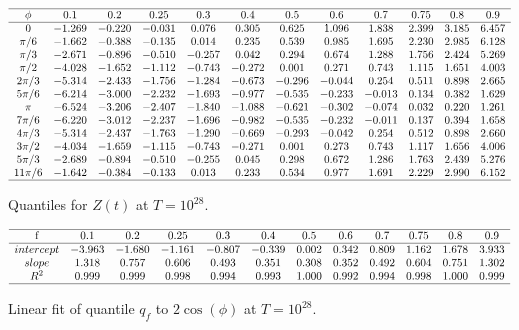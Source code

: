 \documentclass[twoside]{article}
\begin{document}
\begin{table}
\centering \(\begin{array}{cccccccccccc}
\hline
\phi&0.1&0.2&0.25&0.3&0.4&0.5&0.6&0.7&0.75&0.8&0.9 \\
\hline
0&-1.269&-0.220&-0.031&0.076&0.305&0.625&1.096&1.838&2.399&3.185&6.457\\
\pi/6 &-1.662&-0.388&-0.135&0.014&0.235&0.539&0.985&1.695&2.230&2.985&6.128\\
\pi/3 &-2.671&-0.896&-0.510&-0.257&0.042&0.294&0.674&1.288&1.756&2.424&5.269\\
\pi/2 &-4.028&-1.652&-1.112&-0.743&-0.272&0.001&0.271&0.743&1.115&1.651&4.003\\
2\pi/3 &-5.314&-2.433&-1.756&-1.284&-0.673&-0.296&-0.044&0.254&0.511&0.898&2.665\\
5\pi/6 &-6.214&-3.000&-2.232&-1.693&-0.977&-0.535&-0.233&-0.013&0.134&0.382&1.629\\
\pi &-6.524&-3.206&-2.407&-1.840&-1.088&-0.621&-0.302&-0.074&0.032&0.220&1.261\\
7\pi/6 &-6.220&-3.012&-2.237&-1.696&-0.982&-0.535&-0.232&-0.011&0.137&0.394&1.658\\
4\pi/3 &-5.314&-2.437&-1.763&-1.290&-0.669&-0.293&-0.042&0.254&0.512&0.898&2.660\\
3\pi/2 &-4.034&-1.659&-1.115&-0.743&-0.271&0.001&0.273&0.743&1.117&1.656&4.006\\
5\pi/3 &-2.689&-0.894&-0.510&-0.255&0.045&0.298&0.672&1.286&1.763&2.439&5.276\\
11\pi/6 &-1.642&-0.384&-0.133&0.013&0.233&0.534&0.977&1.691&2.229&2.990&6.152\\
\hline
\end{array}\)
\caption{Quantiles  for  $Z(t)$ at $T=10^{28}$.}
\label{tab:quantiles28}
\end{table}

\begin{table}
\centering \(\begin{array}{cccccccccccc}
\hline
$f$&0.1&0.2&0.25&0.3&0.4&0.5&0.6&0.7&0.75&0.8&0.9\\
\hline
intercept&-3.963&-1.680&-1.161&-0.807&-0.339&0.002&0.342&0.809&1.162&1.678&3.933\\
slope&1.318&0.757&0.606&0.493&0.351&0.308&0.352&0.492&0.604&0.751&1.302\\
R^2&0.999&0.999&0.998&0.994&0.993&1.000&0.992&0.994&0.998&1.000&0.999\\
\hline
\end{array}\)
\caption{Linear fit of quantile $q_f$ to $2\cos(\phi)$ at $T=10^{28}$.}
\label{tab:fit28}
\end{table}
\end{document}
